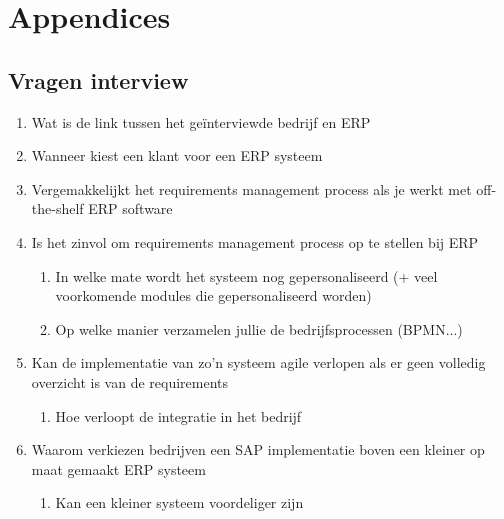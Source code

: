 
\chapter{Appendices}
\label{ch:vragen}
\section{Vragen interview}
\begin{enumerate}
    \item Wat is de link tussen het geïnterviewde bedrijf en ERP
    
    \item Wanneer kiest een klant voor een ERP systeem
    
    \item Vergemakkelijkt het requirements management process als je werkt met off-the-shelf ERP software
     
    \item Is het zinvol om requirements management process op te stellen bij ERP
    
    \begin{enumerate}
        \item In welke mate wordt het systeem nog gepersonaliseerd (+ veel voorkomende modules die gepersonaliseerd worden)
        
        \item Op welke manier verzamelen jullie de bedrijfsprocessen (BPMN...)
    \end{enumerate}

    \item Kan de implementatie van zo'n systeem agile verlopen als er geen volledig overzicht is van de requirements
    
    \begin{enumerate}
        \item Hoe verloopt de integratie in het bedrijf
    \end{enumerate}
    
    \item Waarom verkiezen bedrijven een SAP implementatie boven een kleiner op maat gemaakt ERP systeem
    
    \begin{enumerate}
        \item Kan een kleiner systeem voordeliger zijn
    \end{enumerate}
    

\end{enumerate}
